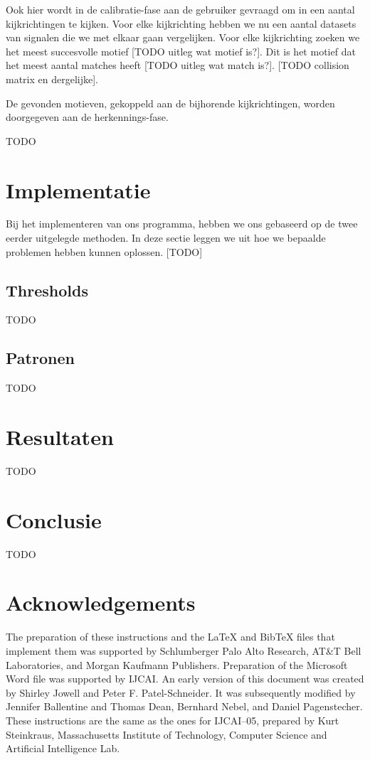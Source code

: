 \documentclass{article}
\begin{document}
Ook hier wordt in de calibratie-fase aan de gebruiker gevraagd om in een aantal kijkrichtingen te kijken. Voor elke kijkrichting hebben we nu een aantal datasets van signalen die we met elkaar gaan vergelijken. Voor elke kijkrichting zoeken we het meest succesvolle motief [TODO uitleg wat motief is?]. Dit is het motief dat het meest aantal matches heeft [TODO uitleg wat match is?]. [TODO collision matrix en dergelijke].

De gevonden motieven, gekoppeld aan de bijhorende kijkrichtingen, worden doorgegeven aan de herkennings-fase. 

TODO

\section{Implementatie}

Bij het implementeren van ons programma, hebben we ons gebaseerd op de twee eerder uitgelegde methoden. In deze sectie leggen we uit hoe we bepaalde problemen hebben kunnen oplossen. [TODO]

\subsection{Thresholds}

TODO

\subsection{Patronen}

TODO

\section{Resultaten}
TODO

\section{Conclusie}
TODO

\section*{Acknowledgements}

The preparation of these instructions and the \LaTeX{} and Bib\TeX{}
files that implement them was supported by Schlumberger Palo Alto
Research, AT\&T Bell Laboratories, and Morgan Kaufmann Publishers.
Preparation of the Microsoft Word file was supported by IJCAI.  An
early version of this document was created by Shirley Jowell and Peter
F. Patel-Schneider.  It was subsequently modified by Jennifer
Ballentine and Thomas Dean, Bernhard Nebel, and Daniel Pagenstecher.
These instructions are the same as the ones for IJCAI--05, prepared by
Kurt Steinkraus, Massachusetts Institute of Technology, Computer
Science and Artificial Intelligence Lab.
\end{document}
